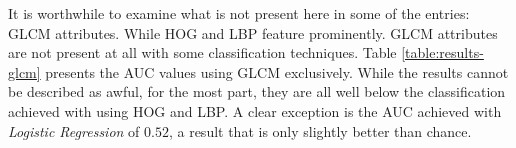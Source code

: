 \documentclass[letterpaper, notitlepage]{report}
\begin{document}

{
\begin{small}
\renewcommand{\arraystretch}{1.2}




\end{small}
}

It is worthwhile to examine what is not present here in some of the entries: GLCM attributes. While HOG and LBP feature prominently. GLCM attributes are not present at all with some classification techniques. Table \ref{table:results-glcm} presents the AUC values using GLCM exclusively. While the results cannot be described as awful, for the most part, they are all well below the classification achieved with using HOG and LBP. A clear exception is the AUC achieved with \textit{Logistic Regression} of $0.52$, a result that is only slightly better than chance.

\begin{small}
\renewcommand{\arraystretch}{1.2}

\end{small}
\end{document}
